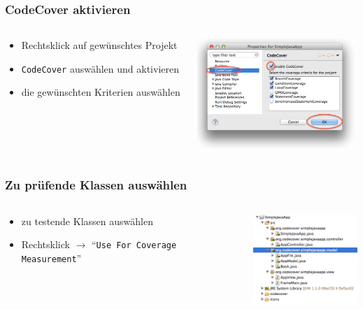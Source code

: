 \documentclass{beamer}
\begin{document}
  \begin{frame}
    \frametitle{CodeCover aktivieren}
    \begin{columns}
      \begin{column}{4cm}
        \begin{itemize}
          \item Rechtsklick auf gewünschtes Projekt
          \item \texttt{CodeCover} auswählen und aktivieren
          \item die gewünschten Kriterien auswählen
        \end{itemize}
        \vspace{2cm}
      \end{column}
      \begin{column}{6cm}
        \begin{overprint}
          \includegraphics[width=6cm]{pictures/activate.png}
        \end{overprint}
      \end{column}
    \end{columns}
  \end{frame}

  \begin{frame}
    \frametitle{Zu prüfende Klassen auswählen}
    \begin{columns}
      \begin{column}{5cm}
        \begin{itemize}
          \item zu testende Klassen auswählen
          \item Rechtsklick $\rightarrow$ ``\texttt{Use For Coverage Measurement}''
        \end{itemize}
        \vspace{2cm}
      \end{column}
      \begin{column}{5cm}
        \begin{overprint}
          \includegraphics[width=4cm]{pictures/testclasses.png}
        \end{overprint}
      \end{column}
    \end{columns}
  \end{frame}
\end{document}
